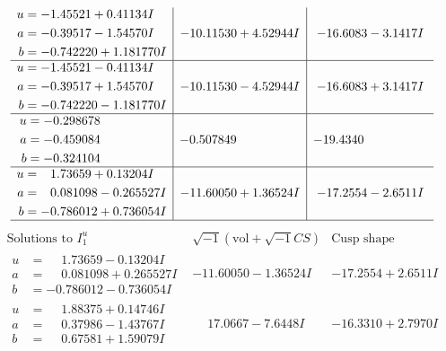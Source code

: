 \documentclass[1p]{elsarticle_modified}
\theoremstyle{definition}
\newcommand{\I}{\sqrt{-1}}
\begin{document}
$$\begin{array}{c|c|c}
\begin{aligned}
u &= -1.45521 + 0.41134 I \\
a &= -0.39517 - 1.54570 I \\
b &= -0.742220 + 1.181770 I\end{aligned}
 & -10.11530 + 4.52944 I & -16.6083 - 3.1417 I \\ \hline\begin{aligned}
u &= -1.45521 - 0.41134 I \\
a &= -0.39517 + 1.54570 I \\
b &= -0.742220 - 1.181770 I\end{aligned}
 & -10.11530 - 4.52944 I & -16.6083 + 3.1417 I \\ \hline\begin{aligned}
u &= -0.298678\phantom{ +0.000000I} \\
a &= -0.459084\phantom{ +0.000000I} \\
b &= -0.324104\phantom{ +0.000000I}\end{aligned}
 & -0.507849\phantom{ +0.000000I} & -19.4340\phantom{ +0.000000I} \\ \hline\begin{aligned}
u &= \phantom{-}1.73659 + 0.13204 I \\
a &= \phantom{-}0.081098 - 0.265527 I \\
b &= -0.786012 + 0.736054 I\end{aligned}
 & -11.60050 + 1.36524 I & -17.2554 - 2.6511 I\\
 \hline 
 \end{array}$$\newpage$$\begin{array}{c|c|c}  
\text{Solutions to }I^u_{1}& \I (\text{vol} + \sqrt{-1}CS) & \text{Cusp shape}\\
 \hline 
\begin{aligned}
u &= \phantom{-}1.73659 - 0.13204 I \\
a &= \phantom{-}0.081098 + 0.265527 I \\
b &= -0.786012 - 0.736054 I\end{aligned}
 & -11.60050 - 1.36524 I & -17.2554 + 2.6511 I \\ \hline\begin{aligned}
u &= \phantom{-}1.88375 + 0.14746 I \\
a &= \phantom{-}0.37986 - 1.43767 I \\
b &= \phantom{-}0.67581 + 1.59079 I\end{aligned}
 & \phantom{-}17.0667 - 7.6448 I & -16.3310 + 2.7970 I \\ \hline\begin{aligned}

\end{aligned}
\end{array}$$
\end{document}
